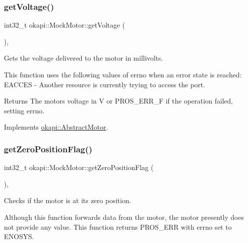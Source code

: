 \subsubsection{\texorpdfstring{getVoltage()}{getVoltage()}}
{\footnotesize\ttfamily int32\+\_\+t okapi\+::\+Mock\+Motor\+::get\+Voltage (\begin{DoxyParamCaption}{ }\end{DoxyParamCaption})\hspace{0.3cm}{\ttfamily [override]}, {\ttfamily [virtual]}}



Gets the voltage delivered to the motor in millivolts. 

This function uses the following values of errno when an error state is reached\+: E\+A\+C\+C\+ES -\/ Another resource is currently trying to access the port.

\begin{DoxyReturn}{Returns}
The motor\textquotesingle{}s voltage in V or P\+R\+O\+S\+\_\+\+E\+R\+R\+\_\+F if the operation failed, setting errno. 
\end{DoxyReturn}


Implements \mbox{\hyperlink{classokapi_1_1AbstractMotor_a855b35b508e90074f21662b06ad2a0c8}{okapi\+::\+Abstract\+Motor}}.

\mbox{\label{classokapi_1_1MockMotor_aaf19a2d2c9cec497a84e5862a3948d7d}} 
\subsubsection{\texorpdfstring{getZeroPositionFlag()}{getZeroPositionFlag()}}
{\footnotesize\ttfamily int32\+\_\+t okapi\+::\+Mock\+Motor\+::get\+Zero\+Position\+Flag (\begin{DoxyParamCaption}{ }\end{DoxyParamCaption})\hspace{0.3cm}{\ttfamily [override]}, {\ttfamily [virtual]}}



Checks if the motor is at its zero position. 

Although this function forwards data from the motor, the motor presently does not provide any value. This function returns P\+R\+O\+S\+\_\+\+E\+RR with errno set to E\+N\+O\+S\+YS.

